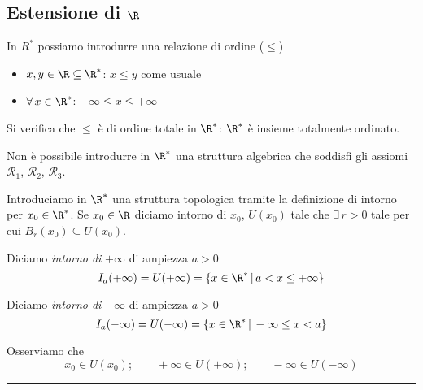 \subsection{Estensione di $ \R $}

In $ R^{*} $ possiamo introdurre una relazione di ordine ($\le$)\begin{itemize}
    \item $ x, y \in \R \subseteq \R^{*} $: $ x\le y $ come usuale
    \item $ \forall\, x \in \R^{*} $: $ - \infty \le x \le + \infty $
\end{itemize}
Si verifica che $ \le $ è di ordine totale in $ \R^{*} $: $ \R^{*} $ è insieme totalmente ordinato.

Non è possibile introdurre in $ \R^{*} $ una struttura algebrica che soddisfi gli assiomi $ \mathcal{R}_1 $, $ \mathcal{R}_2 $, $\mathcal{R}_3$.


Introduciamo in $ \R^{*} $ una struttura topologica tramite la definizione di intorno per $ x_0 \in \R^{*} $.
Se $ x_0 \in \R $ diciamo intorno di $ x_0 $, $ U(x_0) $ tale che $ \exists\, r>0 $ tale per cui $ B_{r}(x_0) \subseteq U(x_0)  $.

Diciamo \textit{intorno di } $ + \infty $ di ampiezza $ a>0 $ \[
    I_{a}(+ \infty)=U(+ \infty)=\{x \in \R^{*}\,|\, a < x \le + \infty\} 
\]

Diciamo \textit{intorno di } $ - \infty $ di ampiezza $ a>0 $ \[
    I_{a}(- \infty)=U(- \infty)=\{x \in \R^{*}\,|\, - \infty \le x <a\} 
\]

Osserviamo che \[
    x_0 \in U(x_0); \qquad + \infty \in U (+ \infty); \qquad - \infty \in U(- \infty)
\]

\rule{7em}{.4pt}

